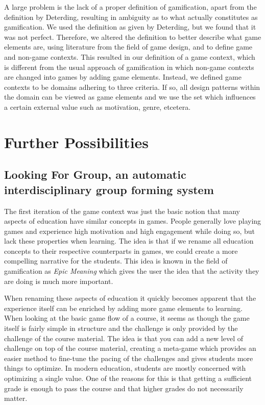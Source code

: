 \documentclass[11pt]{article}
\begin{document}
A large problem is the lack of a proper definition of gamification, apart from the definition by Deterding, resulting in ambiguity as to what actually constitutes as gamification. We used the definition as given by Deterding, but we found that it was not perfect. Therefore, we altered the definition to better describe what game elements are, using literature from the field of game design, and to define game and non-game contexts. This resulted in our definition of a game context, which is different from the usual approach of gamification in which non-game contexts are changed into games by adding game elements. Instead, we defined game contexts to be domains adhering to three criteria. If so, all design patterns within the domain can be viewed as game elements and we use the set which influences a certain external value such as motivation, genre, etcetera.


\pagebreak



\pagebreak
\appendix
\section{Further Possibilities}
\subsection{Looking For Group, an automatic interdisciplinary group forming system}
The first iteration of the game context was just the basic notion that many aspects of education have similar concepts in games. People generally love playing games and experience high motivation and high engagement while doing so, but lack these properties when learning. The idea is that if we rename all education concepts to their respective counterparts in games, we could create a more compelling narrative for the students. This idea is known in the field of gamification as \emph{Epic Meaning} which gives the user the idea that the activity they are doing is much more important. 

When renaming these aspects of education it quickly becomes apparent that the experience itself can be enriched by adding more game elements to learning. When looking at the basic game flow of a course, it seems as though the game itself is fairly simple in structure and the challenge is only provided by the challenge of the course material. The idea is that you can add a new level of challenge on top of the course material, creating a meta-game which provides an easier method to fine-tune the pacing of the challenges and gives students more things to optimize. In modern education, students are mostly concerned with optimizing a single value. One of the reasons for this is that getting a sufficient grade is enough to pass the course and that higher grades do not necessarily matter. 
\end{document}

